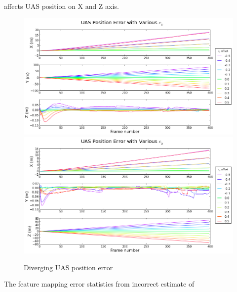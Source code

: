  affects UAS
position on X and Z axis.

\begin{figure}[h]
  \centering
  \includegraphics[scale=0.5]{./Figures/SimulationFigures/Figure36.png}
  \includegraphics[scale=0.5]{./Figures/SimulationFigures/Figure37.png}
  \caption{Diverging UAS position error}
  \label{fig:simfig36-37}
\end{figure}

The feature mapping error statistics from incorrect estimate of 
